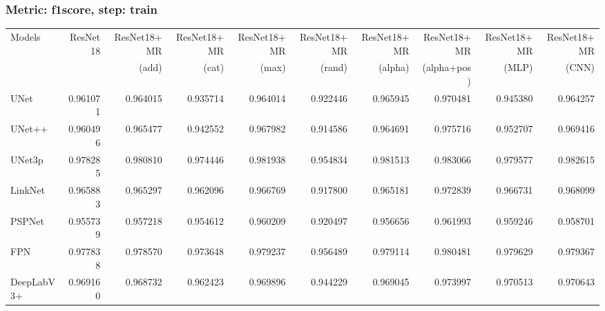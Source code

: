 \documentclass{article}
\begin{document}
\subsubsection{Metric: f1score, step: train}
\begin{tabular}{lrrrrrrrrr}
\toprule
Models & ResNet18 & ResNet18+MR & ResNet18+MR & ResNet18+MR & ResNet18+MR & ResNet18+MR & ResNet18+MR & ResNet18+MR & ResNet18+MR \\
       &          &       (add) &       (cat) &       (max) &      (rand) &     (alpha) & (alpha+pos) &       (MLP) &       (CNN) \\
\midrule
UNet & 0.961071 & 0.964015 & 0.935714 & 0.964014 & 0.922446 & 0.965945 & 0.970481 & 0.945380 & 0.964257 \\
UNet++ & 0.960496 & 0.965477 & 0.942552 & 0.967982 & 0.914586 & 0.964691 & 0.975716 & 0.952707 & 0.969416 \\
UNet3p & 0.978285 & 0.980810 & 0.974446 & 0.981938 & 0.954834 & 0.981513 & 0.983066 & 0.979577 & 0.982615 \\
LinkNet & 0.965883 & 0.965297 & 0.962096 & 0.966769 & 0.917800 & 0.965181 & 0.972839 & 0.966731 & 0.968099 \\
PSPNet & 0.955739 & 0.957218 & 0.954612 & 0.960209 & 0.920497 & 0.956656 & 0.961993 & 0.959246 & 0.958701 \\
FPN & 0.977838 & 0.978570 & 0.973648 & 0.979237 & 0.956489 & 0.979114 & 0.980481 & 0.979629 & 0.979367 \\
DeepLabV3+ & 0.969160 & 0.968732 & 0.962423 & 0.969896 & 0.944229 & 0.969045 & 0.973997 & 0.970513 & 0.970643 \\
\bottomrule
\end{tabular}
\end{document}
